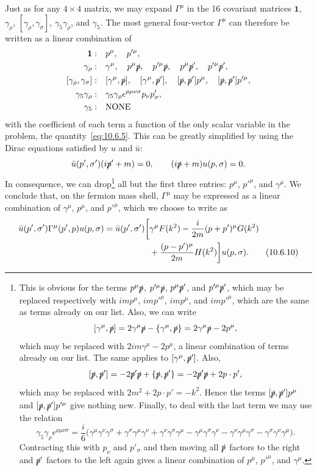 Just as for any $4\times4$ matrix, we may expand $\Gamma^\mu$ in the 16
covariant matrices $\mathbf{1}$, $\gamma_\rho$,
$[\gamma_\rho,\gamma_\sigma]$, $\gamma_5\gamma_\rho$, and $\gamma_5$. The most
general four-vector $\Gamma^\mu$ can therefore be written as a linear
combination of
\begin{align*}
  \mathbf{1}:\quad& p^\mu,\quad p'^\mu,
  \\
  \gamma_\rho:\quad& \gamma^\mu,\quad
    p^\mu\sl{p},\quad p'^\mu\sl{p},\quad
    p^\mu\sl{p}',\quad p'^\mu\sl{p}',
  \\
  [\gamma_\rho,\gamma_\sigma]:\quad&
    [\gamma^\mu,\sl{p}],\quad [\gamma^\mu,\sl{p}'],\quad
    [\sl{p},\sl{p}']p^\mu,\quad [\sl{p},\sl{p}']p'^\mu,
  \\
  \gamma_5\gamma_\rho:\quad&
    \gamma_5\gamma_\rho\epsilon^{\rho\mu\nu\sigma}p_\nu p'_\sigma,
  \\
  \gamma_5:\quad& \text{NONE}
\end{align*}
with the coefficient of each term a function of the only scalar variable in
the problem, the quantity~\eqref{eq:10.6.5}. This can be greatly simplified by
using the Dirac equations satisfied by $u$ and $\bar u$:
\begin{equation*}
  \bar u(p',\sigma')(i\sl{p}'+m)=0,
  \qquad
  (i\sl{p}+m)u(p,\sigma)=0.
\end{equation*}
In consequence, we can drop\footnote{This is obvious for the terms
$p^\mu\sl{p}$, $p'^\mu\sl{p}$, $p^\mu\sl{p}'$, and
$p'^\mu\sl{p}'$, which may be replaced respectively with $imp^\mu$,
$imp'^\mu$, $imp^\mu$, and $imp'^\mu$, which are the same as terms already
on our list. Also, we can write
\[
  [\gamma^\mu,\sl{p}]
  =2\gamma^\mu\sl{p}-\{\gamma^\mu,\sl{p}\}
  =2\gamma^\mu\sl{p}-2p^\mu,
\]
which may be replaced with $2im\gamma^\mu-2p^\mu$, a linear combination of
terms already on our list. The same applies to
$[\gamma^\mu,\sl{p}']$. Also,
\[
  [\sl{p},\sl{p}']
  =-2\sl{p}'\sl{p}+\{\sl{p},\sl{p}'\}
  =-2\sl{p}'\sl{p}+2p\cdot p',
\]
which may be replaced with $2m^2+2p\cdot p'=-k^2$. Hence the terms
$[\sl{p},\sl{p}']p^\mu$ and $[\sl{p},\sl{p}']p'^\mu$ give nothing new.
Finally, to deal with the last term we may use the relation
\[
  \gamma_5\gamma_\rho\epsilon^{\rho\mu\nu\sigma}
  =\frac{i}{6}\bigl(
  \gamma^\mu\gamma^\nu\gamma^\sigma
  +\gamma^\sigma\gamma^\mu\gamma^\nu
  +\gamma^\nu\gamma^\sigma\gamma^\mu
  -\gamma^\mu\gamma^\sigma\gamma^\nu
  -\gamma^\nu\gamma^\mu\gamma^\sigma
  -\gamma^\sigma\gamma^\nu\gamma^\mu\bigr).
\]
Contracting this with $p_\nu$ and $p'_\sigma$ and then moving all $\sl{p}$
factors to the right and $\sl{p}'$ factors to the left again gives a linear
combination of $p^\mu$, $p'^\mu$, and $\gamma^\mu$.} all but the first three
entries: $p^\mu$, $p'^\mu$, and $\gamma^\mu$. We conclude that, on the fermion
mass shell, $\Gamma^\mu$ may be expressed as a linear combination of
$\gamma^\mu$, $p^\mu$, and $p'^\mu$, which we choose to write as
\begin{align}
  \bar u(p',\sigma')\Gamma^\mu(p',p)u(p,\sigma)
  =\bar u(p',\sigma')\biggl[
  &\gamma^\mu F(k^2)-\frac{i}{2m}(p+p')^\mu G(k^2) \notag\\
  &+\frac{(p-p')^\mu}{2m}H(k^2)\biggr]u(p,\sigma).
  \tag{10.6.10}\label{eq:10.6.10}
\end{align}

